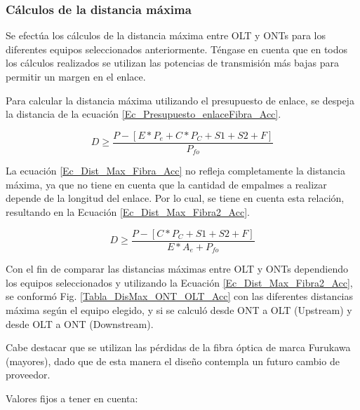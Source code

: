 \documentclass[12pt,a4paper]{book}
\begin{document}
\medskip

\subsubsection{Cálculos de la distancia máxima}\label{subsec_calculo_dist_max_acc}

Se efectúa los cálculos de la distancia máxima entre OLT y ONTs para los
diferentes equipos seleccionados anteriormente. Téngase en cuenta que en
todos los cálculos realizados se utilizan las potencias de transmisión más
bajas para permitir un margen en el enlace.

\medskip

Para calcular la distancia máxima utilizando el presupuesto de enlace, se
despeja la distancia de la ecuación \ref{Ec_Presupuesto_enlaceFibra_Acc}.\medskip

\begin{equation}\label{Ec_Dist_Max_Fibra_Acc}
D\geq \frac{P-[E*P_e+C*P_C+S1+S2+F]}{P_{fo}}
\end{equation}

La ecuación \ref{Ec_Dist_Max_Fibra_Acc} no refleja completamente la distancia máxima, ya que no
tiene en cuenta que la cantidad de empalmes a realizar depende de la
longitud del enlace. Por lo cual, se tiene en cuenta esta relación, resultando
en la Ecuación \ref{Ec_Dist_Max_Fibra2_Acc}.

\begin{equation}\label{Ec_Dist_Max_Fibra2_Acc}
D\geq \frac{P-[C*P_C+S1+S2+F]}{E*A_e+P_{fo}}
\end{equation}

Con el fin de comparar las distancias máximas entre OLT y ONTs
dependiendo los equipos seleccionados y utilizando la Ecuación \ref{Ec_Dist_Max_Fibra2_Acc}, se
conformó Fig. \ref{Tabla_DisMax_ONT_OLT_Acc} con las diferentes distancias máxima según el equipo
elegido, y si se calculó desde ONT a OLT (Upstream) y desde OLT a ONT
(Downstream). \medskip

Cabe destacar que se utilizan las pérdidas de la fibra óptica de marca Furukawa (mayores), dado que de esta manera el diseño contempla un futuro cambio de proveedor. \medskip

Valores fijos a tener en cuenta:\medskip
\end{document}
